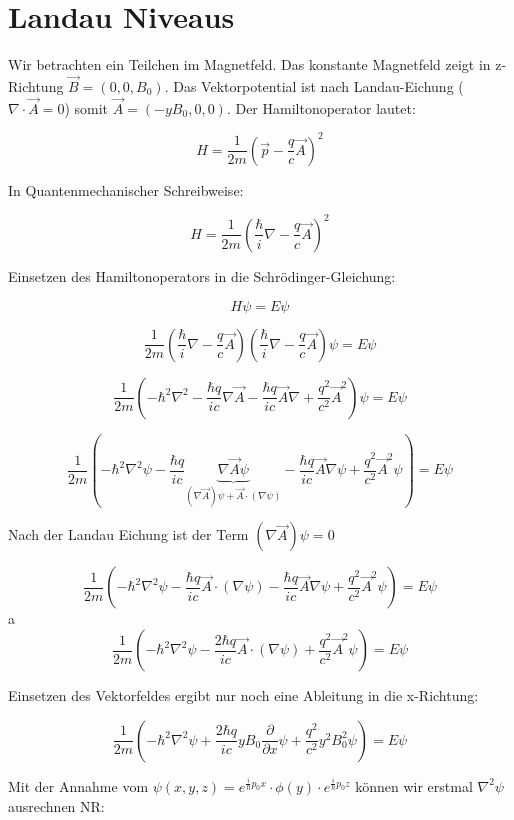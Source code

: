 



\section*{Landau Niveaus}

Wir betrachten ein Teilchen im Magnetfeld. Das konstante Magnetfeld zeigt in z-Richtung \(\vec B=(0,0,B_0)\). Das Vektorpotential ist nach Landau-Eichung (\(\nabla\cdot\vec A = 0\)) somit \(\vec A = (-yB_0,0,0)\). Der Hamiltonoperator lautet:

\[H=\frac{1}{2m}\left(\vec p - \frac{q}{c}\vec A\right)^2 \]


In Quantenmechanischer Schreibweise:

\[H=\frac{1}{2m}\left(\frac{\hbar}{i}\nabla - \frac{q}{c}\vec A\right)^2 \]

Einsetzen des Hamiltonoperators in die Schrödinger-Gleichung:

\[H\psi = E\psi\]

\[ \frac{1}{2m}\left(\frac{\hbar}{i}\nabla - \frac{q}{c}\vec A\right)\left(\frac{\hbar}{i}\nabla - \frac{q}{c}\vec A\right)\psi = E\psi \]

\[ \frac{1}{2m}\left(-\hbar^2\nabla^2 -\frac{\hbar q}{ic}\nabla \vec A -\frac{\hbar q}{ic} \vec A \nabla  + \frac{q^2}{c^2}\vec A^2 \right) \psi = E\psi \]


\[ \frac{1}{2m}\left(-\hbar^2\nabla^2\psi -\frac{\hbar q}{ic}\underbrace{\nabla \vec A\psi}_{(\nabla \vec A)\psi + \vec A\cdot(\nabla\psi)} -\frac{\hbar q}{ic} \vec A \nabla\psi  + \frac{q^2}{c^2}\vec A^2\psi \right) = E\psi \]

Nach der Landau Eichung ist der Term \((\nabla \vec A)\psi = 0\)

\[ \frac{1}{2m}\left(-\hbar^2\nabla^2\psi -\frac{\hbar q}{ic}\vec A\cdot(\nabla\psi) -\frac{\hbar q}{ic} \vec A \nabla\psi  + \frac{q^2}{c^2}\vec A^2\psi \right) = E\psi \]
a
\[ \frac{1}{2m}\left(-\hbar^2\nabla^2\psi - \frac{2 \hbar q}{ic}\vec A\cdot(\nabla\psi) + \frac{q^2}{c^2}\vec A^2\psi \right) = E\psi \]


Einsetzen des Vektorfeldes ergibt nur noch eine Ableitung in die x-Richtung:


\[ \frac{1}{2m}\left(-\hbar^2\nabla^2\psi + \frac{2 \hbar q}{ic} yB_0 \frac{\partial}{\partial x} \psi + \frac{q^2}{c^2}y^2B_0^2\psi \right) = E\psi \]

Mit der Annahme vom \(\psi(x,y,z) = e^{\frac{i}{\hbar}p_0x}\cdot \phi(y)\cdot e^{\frac{i}{\hbar}p_0z}\) können wir erstmal \(\nabla^2\psi\) ausrechnen NR:

